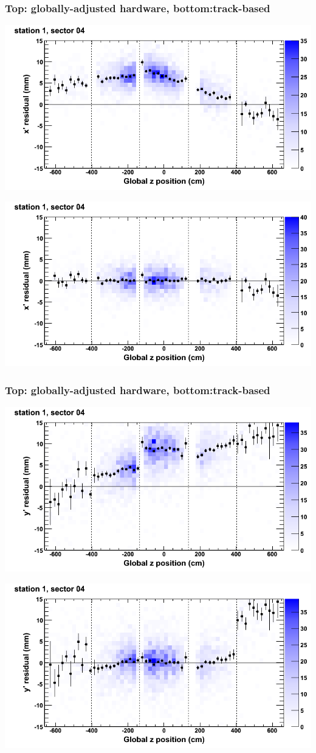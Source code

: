 \documentclass[compress]{beamer}
\begin{document}
\begin{frame}
\frametitle{Top: globally-adjusted hardware, bottom:track-based}
\includegraphics[width=0.7\linewidth]{NOV4_mapplots_HW/DTvsz_st1sec04_x.png}

\includegraphics[width=0.7\linewidth]{NOV4_mapplots/DTvsz_st1sec04_x.png}
\end{frame}

\begin{frame}
\frametitle{Top: globally-adjusted hardware, bottom:track-based}
\includegraphics[width=0.7\linewidth]{NOV4_mapplots_HW/DTvsz_st1sec04_y.png}

\includegraphics[width=0.7\linewidth]{NOV4_mapplots/DTvsz_st1sec04_y.png}
\end{frame}
\end{document}
